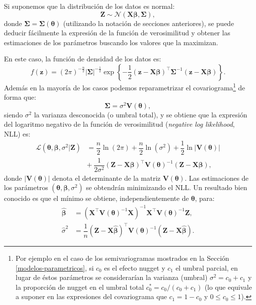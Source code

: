 \documentclass[
]{book}
\theoremstyle{break}
\theoremstyle{definition}
\theoremstyle{definition}
\theoremstyle{definition}
\theoremstyle{definition}
\theoremstyle{remark}
\begin{document}
Si suponemos que la distribución de los datos es normal:
\[\mathbf{Z}\sim \mathcal{N}(\mathbf{X}\boldsymbol{\beta},\boldsymbol{\Sigma}),\]
donde \(\boldsymbol{\Sigma}=\boldsymbol{\Sigma}(\boldsymbol{\theta})\) (utilizando la notación de secciones anteriores), se puede deducir fácilmente la expresión de la función de verosimilitud y obtener las estimaciones de los parámetros buscando los valores que la maximizan.

En este caso, la función de densidad de los datos es:
\[f(\mathbf{z})=(2\pi )^{-\frac{n}{2} } \left| \boldsymbol{\Sigma} \right|^{-\frac{1}{2} }
\exp \left\{ -\dfrac{1}{2}(\mathbf{z}-\mathbf{X}\boldsymbol{\beta})^\top \boldsymbol{\Sigma}^{-1}(\mathbf{z}-\mathbf{X}\boldsymbol{\beta})\right\}.\]
Además en la mayoría de los casos podemos reparametrizar el covariograma\footnote{Por ejemplo en el caso de los semivariogramas mostrados en la Sección \ref{modelos-parametricos}, si \(c_0\) es el efecto nugget y \(c_1\) el umbral parcial, en lugar de éstos parámetros se considerarían la varianza (umbral) \(\sigma^2 =c_0 +c_1\) y la proporción de nugget en el umbral total \(c_0^{\ast} =c_0 /(c_0 +c_1)\) (lo que equivale a suponer en las expresiones del covariograma que \(c_1 = 1 - c_0\) y \(0 \leq c_0 \leq 1\)).} de forma que:
\[\boldsymbol{\Sigma}=\sigma^2 \mathbf{V}(\boldsymbol{\theta}),\]
siendo \(\sigma^2\) la varianza desconocida (o umbral total), y se obtiene que la expresión del logaritmo negativo de la función de verosimilitud (\emph{negative log likelihood}, NLL) es:
\[\begin{aligned}
\mathcal{L}(\boldsymbol{\theta},\boldsymbol{\beta},\sigma^2 \left| \mathbf{Z} \right.) & = \dfrac{n}{2} \ln (2\pi) + \dfrac{n}{2} \ln(\sigma^2) + \dfrac{1}{2} \ln \left| \mathbf{V}(\boldsymbol{\theta}) \right|  \\
& + \ \dfrac{1}{2\sigma^2 }(\mathbf{Z}-\mathbf{X}\boldsymbol{\beta})^\top \mathbf{V}(\boldsymbol{\theta})^{-1}(\mathbf{Z}-\mathbf{X}\boldsymbol{\beta}),
\end{aligned}\]
donde \(\left| \mathbf{V}(\boldsymbol{\theta})\right|\) denota el determinante de la matriz \(\mathbf{V}(\boldsymbol{\theta})\).
Las estimaciones de los parámetros \((\boldsymbol{\theta}, \boldsymbol{\beta}, \sigma^2)\) se obtendrán minimizando el NLL.
Un resultado bien conocido es que el mínimo se obtiene, independientemente de \(\boldsymbol{\theta}\), para:
\begin{equation} 
  \begin{aligned}
  \hat{\boldsymbol{\beta}} & =(\mathbf{X}^\top\mathbf{V}(\boldsymbol{\theta})^{-1} \mathbf{X})^{-1} \mathbf{X}^\top\mathbf{V}(\boldsymbol{\theta})^{-1} \mathbf{Z}, \\
  \hat{\sigma }^2 & =\dfrac{1}{n}(\mathbf{Z}-\mathbf{X}\hat{\boldsymbol{\beta}})^\top
  \mathbf{V}(\boldsymbol{\theta})^{-1}(\mathbf{Z}-\mathbf{X}\hat{\boldsymbol{\beta}}).
  \end{aligned}
  \label{eq:estimadores-ml}
\end{equation}
\end{document}
